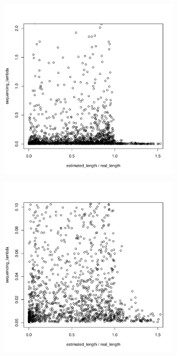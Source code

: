 \begin{figure}[!t]
\centering

    \begin{subfigure}{\textwidth}
        \centering
        \includegraphics[width=0.45\textheight]{figures/lenest/lambda-len_ratio-2.pdf}
    \end{subfigure}
    
    \begin{subfigure}{\textwidth}
        \centering
        \includegraphics[width=0.45\textheight]{figures/lenest/lambda-len_ratio-0_10.pdf}
    \end{subfigure}



\end{figure}
